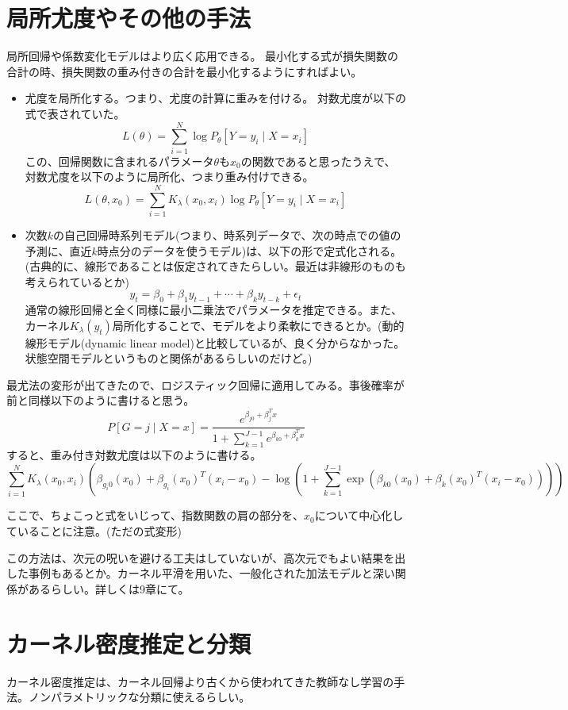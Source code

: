 \documentclass[uplatex]{jsarticle}
\begin{document}
\section{局所尤度やその他の手法}
局所回帰や係数変化モデルはより広く応用できる。
最小化する式が損失関数の合計の時、損失関数の重み付きの合計を最小化するようにすればよい。
\begin{itemize}
  \item 尤度を局所化する。つまり、尤度の計算に重みを付ける。
  対数尤度が以下の式で表されていた。
  \[
    L(\theta)=\sum_{i=1}^{N}\log P_{\theta}[Y=
    y_{i} \mid X=x_{i}]
  \]
  この、回帰関数に含まれるパラメータ$\theta$も$x_{0}$の関数であると思ったうえで、対数尤度を以下のように局所化、つまり重み付けできる。
  \[
    L(\theta,x_{0})=\sum_{i=1}^{N}K_{\lambda}(x_{0},x_{i})\log P_{\theta}[Y=
    y_{i} \mid X=x_{i}]
  \]

  \item 次数$k$の自己回帰時系列モデル(つまり、時系列データで、次の時点での値の予測に、直近$k$時点分のデータを使うモデル)は、以下の形で定式化される。(古典的に、線形であることは仮定されてきたらしい。最近は非線形のものも考えられているとか)
  \[
    y_{t}=\beta_{0}+\beta_{1}y_{t-1}+\cdots+\beta_{k}y_{t-k}+\epsilon_{t}
  \]
  通常の線形回帰と全く同様に最小二乗法でパラメータを推定できる。また、カーネル$K_{\lambda}(y_{t})$局所化することで、モデルをより柔軟にできるとか。(動的線形モデル(dynamic linear model)と比較しているが、良く分からなかった。状態空間モデルというものと関係があるらしいのだけど。)
\end{itemize}

最尤法の変形が出てきたので、ロジスティック回帰に適用してみる。事後確率が前と同様以下のように書けると思う。
\[
  P[G=j \mid X=x]=\frac{e^{\beta_{j0}+\beta_{j}^{T}x}}{1+\sum_{k=1}^{J-1}e^{\beta_{k0}+\beta_{k}^{T}x}}
\]
すると、重み付き対数尤度は以下のように書ける。
\[
  \sum_{i=1}^{N}K_{\lambda}(x_{0},x_{i}) \left ( \beta_{g_{i}0}(x_{0})+\beta_{g_{i}}(x_{0})^{T}(x_{i}-x_{0})- \log \left ( 1+\sum_{k=1}^{J-1}\exp(\beta_{k0}(x_{0})+\beta_{k}(x_{0})^{T}(x_{i}-x_{0}) ) \right ) \right )
\]

ここで、ちょこっと式をいじって、指数関数の肩の部分を、$x_0$について中心化していることに注意。(ただの式変形)

この方法は、次元の呪いを避ける工夫はしていないが、高次元でもよい結果を出した事例もあるとか。カーネル平滑を用いた、一般化された加法モデルと深い関係があるらしい。詳しくは9章にて。

\section{カーネル密度推定と分類}
カーネル密度推定は、カーネル回帰より古くから使われてきた教師なし学習の手法。ノンパラメトリックな分類に使えるらしい。
\end{document}
